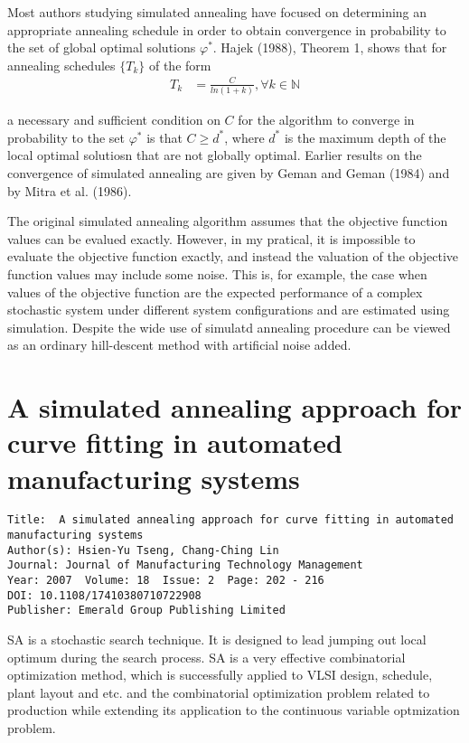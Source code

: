 \documentclass[pdftex,11pt]{article}
\begin{document}
Most authors studying simulated annealing have focused on determining an appropriate annealing schedule in order to obtain convergence in probability to the set of global optimal solutions $\varphi^*$. Hajek (1988), Theorem 1, shows that for annealing schedules $\{T_k\}$ of the form
\begin{align}
  T_k &= \frac{C}{ln(1+k)}, \forall k \in \mathbb{N}
\end{align}

a necessary and sufficient condition on $C$ for the algorithm to converge in probability to the set $\varphi^*$ is that $ C \geq d^*$, where $d^*$ is the maximum depth of the local optimal solutiosn that are not globally optimal. Earlier results on the convergence of simulated annealing are given by Geman and Geman (1984) and by Mitra et al. (1986).

The original simulated annealing algorithm assumes that the objective function values can be evalued exactly. However, in my pratical, it is impossible to evaluate the objective function exactly, and instead the valuation of the objective function values may include some noise. This is, for example, the case when values of the objective function are the expected performance of a complex stochastic system under different system configurations and are estimated using simulation. Despite the wide use of simulatd annealing procedure can be viewed as an ordinary hill-descent method with artificial noise added.

\section*{A simulated annealing approach for curve fitting in automated manufacturing systems}
\begin{verbatim}
Title:  A simulated annealing approach for curve fitting in automated manufacturing systems
Author(s): Hsien-Yu Tseng, Chang-Ching Lin
Journal: Journal of Manufacturing Technology Management
Year: 2007  Volume: 18  Issue: 2  Page: 202 - 216 
DOI: 10.1108/17410380710722908
Publisher: Emerald Group Publishing Limited
\end{verbatim}

SA is a stochastic search technique. It is designed to lead jumping out local optimum during the search process. SA is a very effective  combinatorial optimization method, which is successfully applied to VLSI design, schedule, plant layout and etc. and the combinatorial optimization problem related to production while extending its application to the continuous variable optmization problem.
\end{document}
